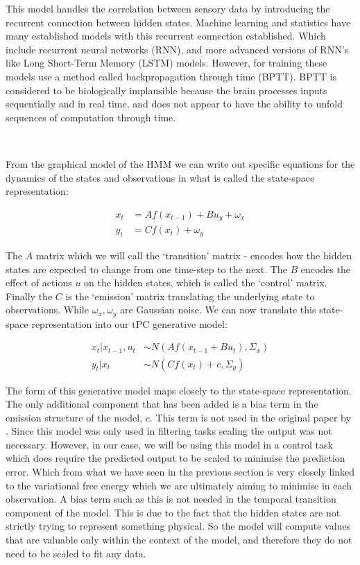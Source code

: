 \documentclass{article}
\begin{document}
This model handles the correlation between sensory data by introducing the recurrent connection between hidden states. Machine learning and statistics have many established models with this recurrent connection established. Which include recurrent neural networks (RNN), and more advanced versions of RNN's like  Long Short-Term Memory (LSTM) models. However, for training these models use a method called backpropagation through time (BPTT). BPTT is considered to be biologically implausible because the brain processes inputs sequentially and in real time, and does not appear to have the ability to unfold sequences of computation through time. \citep{millidge2024temporal}

\

From the graphical model of the HMM we can write out specific equations for the dynamics of the states and observations in what is called the state-space representation:

\begin{equation}\label{eq:tpc}
	\begin{aligned}
		x_t &= A f(x_{t-1}) + B u_y + \omega_x \\
		y_t &= C f(x_t) + \omega_y
	\end{aligned}
\end{equation}

The $A$ matrix which we will call the `transition' matrix - encodes how the hidden states are expected to change from one time-step to the next. The $B$  encodes the effect of actions $u$ on the hidden states, which is called the `control' matrix. Finally the $C$ is the `emission' matrix translating the underlying state to observations. While $\omega_x, \omega_y$ are Gaussian noise. We can now translate this state-space representation into our tPC generative model:

\begin{equation}
\begin{aligned}
	x_t | x_{t-1}, u_{t} &\sim N( A f(x_{t-1} + B u_{t}), \Sigma_x) \\
	y_t | x_t &\sim N( C f(x_t) + c, \Sigma_y)
\end{aligned}
\end{equation}

The form of this generative model maps closely to the state-space representation. The only additional component that has been added is a bias term in the emission structure of the model, $c$. This term is not used in the original paper by \citet{millidge2024temporal}. Since this model was only used in filtering tasks scaling the output was not necessary. However, in our case, we will be using this model in a control task which does require the predicted output to be scaled to minimise the prediction error. Which from what we have seen in the previous section is very closely linked to the variational free energy which we are ultimately aiming to minimise in each observation. A bias term such as this is not needed in the temporal transition component of the model. This is due to the fact that the hidden states are not strictly trying to represent something physical. So the model will compute values that are valuable only within the context of the model, and therefore they do not need to be scaled to fit any data.
\end{document}
